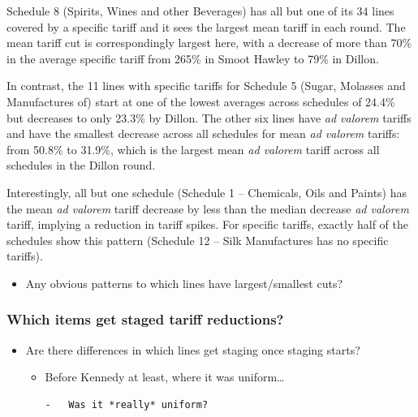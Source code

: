 \documentclass[
  12pt,
]{article}
\providecommand{\tightlist}{%
  \setlength{\itemsep}{0pt}\setlength{\parskip}{0pt}}
\begin{document}
Schedule 8 (Spirits, Wines and other Beverages) has all but one of its 34 lines covered by a specific tariff and it sees the largest mean tariff in each round. The mean tariff cut is correspondingly largest here, with a decrease of more than 70\% in the average specific tariff from 265\% in Smoot Hawley to 79\% in Dillon.

In contrast, the 11 lines with specific tariffs for Schedule 5 (Sugar, Molasses and Manufactures of) start at one of the lowest averages across schedules of 24.4\% but decreases to only 23.3\% by Dillon. The other six lines have \emph{ad valorem} tariffs and have the smallest decrease across all schedules for mean \emph{ad valorem} tariffs: from 50.8\% to 31.9\%, which is the largest mean \emph{ad valorem} tariff across all schedules in the Dillon round.

Interestingly, all but one schedule (Schedule 1 -- Chemicals, Oils and Paints) has the mean \emph{ad valorem} tariff decrease by less than the median decrease \emph{ad valorem} tariff, implying a reduction in tariff spikes. For specific tariffs, exactly half of the schedules show this pattern (Schedule 12 -- Silk Manufactures has no specific tariffs).

\begin{itemize}
\tightlist
\item
  Any obvious patterns to which lines have largest/smallest cuts?
\end{itemize}

\hypertarget{which-items-get-staged-tariff-reductions}{%
\subsubsection{Which items get staged tariff reductions?}\label{which-items-get-staged-tariff-reductions}}

\begin{itemize}
\item
  Are there differences in which lines get staging once staging starts?

  \begin{itemize}
  \item
    Before Kennedy at least, where it was uniform\ldots{}

\begin{verbatim}
-   Was it *really* uniform?
\end{verbatim}
  \end{itemize}
\end{itemize}
\end{document}
